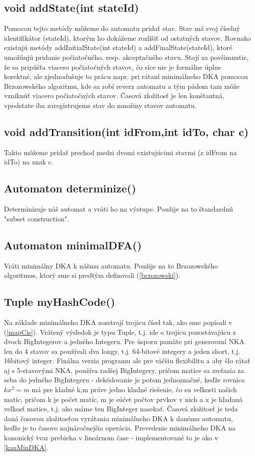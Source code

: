 \subsection*{void addState(int stateId)}
Pomocou tejto metódy môžeme do automatu pridať stav. Stav má svoj číselný identifikátor (stateId), ktorým ho dokážeme rozlíšiť od ostatných stavov. Rovnako existujú metódy addInitialState(int stateId) a addFinalState(stateId), ktoré umožňujú pridanie počiatočného, resp. akceptačného stavu. Stojí za povšimnutie, že sa pripúšťa viacero počiatočných stavov, čo síce nie je formálne úplne korektné, ale zjednodušuje to prácu napr. pri rátaní minimálneho DKA pomocou Brzozowského algoritmu, kde sa robí reverz automatu a tým pádom tam môže vzniknúť viacero počiatočných stavov. Časová zložitosť je len konštantná, vpodstate iba zaregistrujeme stav do množiny stavov automatu.

\subsection*{void addTransition(int idFrom,int idTo, char c)}
Takto môžeme pridať prechod medzi dvomi existujúcimi stavmi (z idFrom na idTo) na znak c.

\subsection*{Automaton determinize()}
Determinizuje náš automat a vráti ho na výstupe. Použije na to štandardnú "subset construction".

\subsection*{Automaton minimalDFA()}
Vráti minimálny DKA k nášmu automatu. Použije na to Brzozowského algoritmus, ktorý sme si predtým definovali (\ref{brzozowski}).

\subsection*{Tuple myHashCode()}
Na základe minimálneho DKA zozstrojí trojicu čísel tak, ako sme popísali v (\ref{mapCis}). Vrátený výsledok je typu Tuple, t.j. ide o trojicu pozostávajúcu z dvoch BigIntegerov a jedného Integeru. Pre úsporu pamäte pri generovaní NKA len do 4 stavov sa používali dva longy, t.j. 64-bitové integery a jeden short, t.j. 16bitový integer. Finálna verzia programu ale pre väčšiu flexibilitu a aby šlo rátať aj s 5-stavovými NKA, používa radšej BigIntegery, pričom matice sa zreťazia za seba do jedného BigIntegeru - dekódovanie je potom jednoznačné, keďže rovnica $kx^2 = m$ má pre kladné k,m práve jedno kladné riešenie, čo su veľkosti našich matíc, pričom k je počet matíc, m je súčet počtov prvkov v nich a x je hľadaná veľkosť matice, t.j. ako máme ten BigInteger nasekať. Časová zložitosť je teda daná časovou zložitosťou vyrátania minimálneho DKA k danému automatu, keďže je to časovo najnáročnejšia operácia. Prevedenie minimálneho DKA na kanonický tvar prebieha v lineárnom čase - implementované to je ako v \ref{kanMinDKA}.

